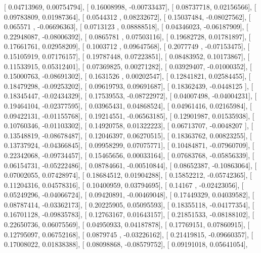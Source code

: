 \documentclass{article}
\begin{document}
       [ 0.04713969,  0.00754794],
       [ 0.16008998, -0.00733437],
       [ 0.08737718,  0.02156566],
       [ 0.09783809,  0.01987364],
       [ 0.0544312 ,  0.08232672],
       [ 0.15037484, -0.08027562],
       [ 0.065571  , -0.06696363],
       [ 0.0713123 ,  0.08888518],
       [ 0.04346023, -0.06187909],
       [ 0.22948087, -0.08006392],
       [ 0.0865781 ,  0.07503116],
       [ 0.19682728,  0.01781897],
       [ 0.17661761,  0.02958209],
       [ 0.1003712 ,  0.09647568],
       [ 0.2077749 , -0.07153475],
       [ 0.15105919,  0.07176157],
       [ 0.19787448,  0.07223851],
       [ 0.08483952,  0.10173867],
       [ 0.11533915,  0.05312401],
       [ 0.07369825,  0.00271282],
       [ 0.03929407, -0.01000352],
       [ 0.15000763, -0.08691302],
       [ 0.1631526 ,  0.00202547],
       [ 0.12841821,  0.02584455],
       [ 0.18479298, -0.09253202],
       [ 0.09619793,  0.09691687],
       [ 0.18362439, -0.0448125 ],
       [ 0.18345447, -0.02434329],
       [ 0.17539553, -0.08722972],
       [ 0.04007498, -0.04004231],
       [ 0.19464104, -0.02377595],
       [ 0.03965431,  0.04868524],
       [ 0.04961416,  0.02165984],
       [ 0.09422131, -0.01155768],
       [ 0.19214551, -0.06563185],
       [ 0.12901987,  0.01535938],
       [ 0.10760346, -0.01103302],
       [ 0.14920758,  0.01322223],
       [ 0.06713707, -0.0048207 ],
       [ 0.13548819, -0.08678487],
       [ 0.12046397,  0.06270515],
       [ 0.18363762,  0.00823255],
       [ 0.13737924, -0.04366845],
       [ 0.09958299,  0.07075771],
       [ 0.10484871, -0.07960709],
       [ 0.22342068, -0.09734457],
       [ 0.15465656,  0.00033164],
       [ 0.07683768, -0.05856339],
       [ 0.06154731, -0.05222486],
       [ 0.08784661, -0.00510844],
       [ 0.08652387, -0.10863064],
       [ 0.07002055,  0.07428974],
       [ 0.18684512,  0.01904288],
       [ 0.15852212, -0.05742365],
       [ 0.11204316,  0.04578316],
       [ 0.10400959,  0.03794695],
       [ 0.14167   , -0.02423056],
       [ 0.05249296, -0.04066724],
       [ 0.09420891, -0.00469048],
       [ 0.17449329,  0.04039582],
       [ 0.08787414, -0.03362173],
       [ 0.20225905,  0.05095593],
       [ 0.18355118, -0.04177354],
       [ 0.16701128, -0.09835783],
       [ 0.12763167,  0.01643157],
       [ 0.21851533, -0.08188102],
       [ 0.22650736,  0.06075569],
       [ 0.04950933,  0.04187878],
       [ 0.17769151,  0.07860915],
       [ 0.12795097,  0.06752168],
       [ 0.0879745 , -0.03226162],
       [ 0.21419815, -0.09660357],
       [ 0.17008022,  0.01838388],
       [ 0.08098868, -0.08579752],
       [ 0.09191018,  0.05641054],
\end{document}
